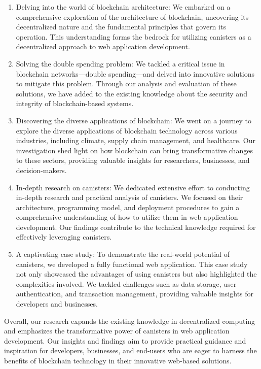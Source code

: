 \begin{enumerate}
    \item  Delving into the world of blockchain architecture: We embarked on a comprehensive exploration of the architecture of blockchain, uncovering its decentralized nature and the fundamental principles that govern its operation. This understanding forms the bedrock for utilizing canisters as a decentralized approach to web application development.

    \item  Solving the double spending problem: We tackled a critical issue in blockchain networks—double spending—and delved into innovative solutions to mitigate this problem. Through our analysis and evaluation of these solutions, we have added to the existing knowledge about the security and integrity of blockchain-based systems.

    \item  Discovering the diverse applications of blockchain: We went on a journey to explore the diverse applications of blockchain technology across various industries, including climate, supply chain management, and healthcare. Our investigation shed light on how blockchain can bring transformative changes to these sectors, providing valuable insights for researchers, businesses, and decision-makers.

    \item  In-depth research on canisters: We dedicated extensive effort to conducting in-depth research and practical analysis of canisters. We focused on their architecture, programming model, and deployment procedures to gain a comprehensive understanding of how to utilize them in web application development. Our findings contribute to the technical knowledge required for effectively leveraging canisters.

    \item  A captivating case study: To demonstrate the real-world potential of canisters, we developed a fully functional web application. This case study not only showcased the advantages of using canisters but also highlighted the complexities involved. We tackled challenges such as data storage, user authentication, and transaction management, providing valuable insights for developers and businesses.
\end{enumerate}

Overall, our research expands the existing knowledge in decentralized computing and emphasizes the transformative power of canisters in web application development. Our insights and findings aim to provide practical guidance and inspiration for developers, businesses, and end-users who are eager to harness the benefits of blockchain technology in their innovative web-based solutions.

